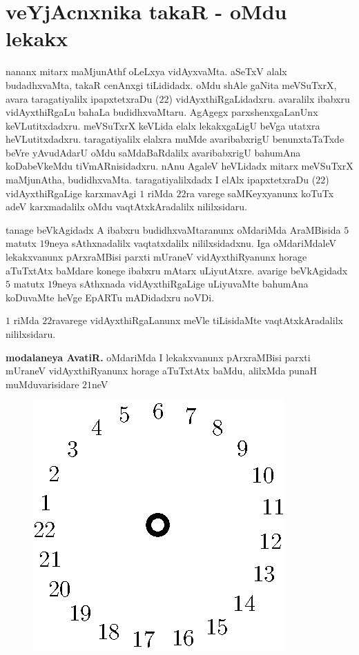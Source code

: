 \chapter{veYjAcnxnika takaR - oMdu lekakx}

nananx mitarx maMjunAthf oLeLxya vidAyxvaMta. aSeTxV alalx budadhxvaMta, takaR cenAnxgi tiLididadx. oMdu shAle gaNita meVSuTxrX, avara taragatiyalilx ipapxtetxraDu ($22$) vidAyxthiRgaLidadxru. avaralilx ibabxru vidAyxthiRgaLu bahaLa budidhxvaMtaru. AgAgegx parxshenxgaLanUnx keVLutitxdadxru. meVSuTxrX keVLida elalx lekakxgaLigU beVga utatxra heVLutitxdadxru. taragatiyalilx elalxra muMde avaribabxrigU benunxtaTaTxde beVre yAvudAdarU oMdu saMdaBaRdalilx avaribabxrigU bahumAna koDabeVkeMdu tiVmARnisidadxru. nAnu AgaleV heVLidadx mitarx meVSuTxrX maMjunAtha, budidhxvaMta. taragatiyalilxdadx I elAlx ipapxtetxraDu ($22$) vidAyxthiRgaLige karxmavAgi $1$ riMda $22$ra varege saMKeyxyanunx koTuTx adeV karxmadalilx oMdu vaqtAtxkAradalilx nililxsidaru.

tanage beVkAgidadx A ibabxru budidhxvaMtaranunx oMdariMda AraMBisida $5$ matutx $19$neya sAthxnadalilx vaqtatxdalilx nililxsidadxnu. Iga oMdariMdaleV lekakxvanunx pArxraMBisi parxti mUraneV vidAyxthiRyanunx horage aTuTxtAtx baMdare konege ibabxru mAtarx uLiyutAtxre. avarige beVkAgidadx $5$ matutx $19$neya sAthxnada vidAyxthiRgaLige uLiyuvaMte bahumAna koDuvaMte heVge EpARTu mADidadxru noVDi.

$1$ riMda $22$ravarege vidAyxthiRgaLanunx meVle tiLisidaMte vaqtAtxkAradalilx nililxsidaru.

{\bf modalaneya AvatiR.} oMdariMda I lekakxvanunx pArxraMBisi parxti mUraneV vidAyxthiRyanunx horage aTuTxtAtx baMdu, alilxMda punaH muMduvarisidare $21$neV
\begin{figure}[H]
\centering
\includegraphics{src/figures/fig8.eps}
\end{figure}


